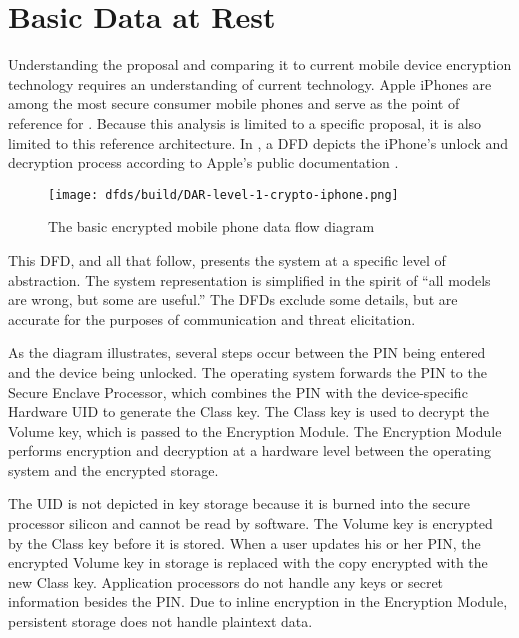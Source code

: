 \modelend


\section{Basic Data at Rest}
\label{sec-basic-dar}

Understanding the \ldawmsr proposal and comparing it to current mobile device encryption technology requires an
understanding of current technology. Apple iPhones are among the most secure consumer mobile phones and serve as the
point of reference for \ldawmsR. Because this analysis is limited to a specific proposal, it is also limited to this
reference architecture. In , a \ac{DFD} depicts the iPhone's unlock and decryption process
according to Apple's public documentation \cite{apple_2020}.

\begin{figure}[h]
    \centering\CaptionFontSize
    \texttt{[image: dfds/build/DAR-level-1-crypto-iphone.png]}
    \caption{The basic encrypted mobile phone data flow diagram}
    \label{fig-dfd-iphone}
\end{figure}

This \ac{DFD}, and all that follow, presents the system at a specific level of abstraction. The system representation is
simplified in the spirit of ``all models are wrong, but some are useful.'' The \acp{DFD} exclude some details, but are
accurate for the purposes of communication and threat elicitation.

As the diagram illustrates, several steps occur between the \ac{PIN} being entered and the device being unlocked. The
operating system forwards the \ac{PIN} to the Secure Enclave Processor, which combines the \ac{PIN} with the
device-specific Hardware \ac{UID} to generate the Class key. The Class key is used to decrypt the Volume key, which is
passed to the Encryption Module. The Encryption Module performs encryption and decryption at a hardware level between
the operating system and the encrypted storage.

The \ac{UID} is not depicted in key storage because it is burned into the secure processor silicon and cannot be read by
software. The Volume key is encrypted by the Class key before it is stored. When a user updates his or her \ac{PIN}, the
encrypted Volume key in storage is replaced with the copy encrypted with the new Class key. Application processors do
not handle any keys or secret information besides the \ac{PIN}. Due to inline encryption in the Encryption Module,
persistent storage does not handle \ac{plaintext} data.


